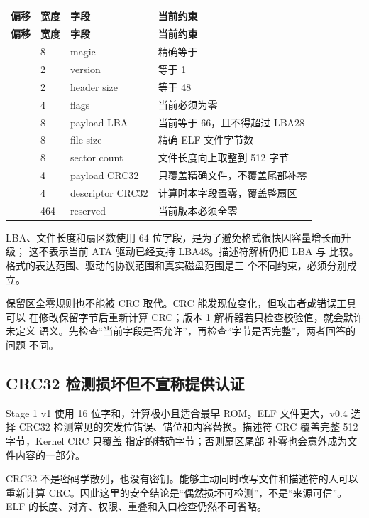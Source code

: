 \begin{longtable}{L{0.13\textwidth}L{0.12\textwidth}L{0.24\textwidth}L{0.39\textwidth}}
\toprule
\textbf{偏移} & \textbf{宽度} & \textbf{字段} & \textbf{当前约束}\\
\midrule
\endfirsthead
\toprule
\textbf{偏移} & \textbf{宽度} & \textbf{字段} & \textbf{当前约束}\\
\midrule
\endhead
{} & 8 & magic & 精确等于 \\
 & 2 & version & 等于 1\\
 & 2 & header size & 等于 48\\
 & 4 & flags & 当前必须为零\\
 & 8 & payload LBA & 当前等于 66，且不得超过 LBA28\\
 & 8 & file size & 精确 ELF 文件字节数\\
 & 8 & sector count & 文件长度向上取整到 512 字节\\
 & 4 & payload CRC32 & 只覆盖精确文件，不覆盖尾部补零\\
 & 4 & descriptor CRC32 & 计算时本字段置零，覆盖整扇区\\
 & 464 & reserved & 当前版本必须全零\\
\bottomrule
\end{longtable}

LBA、文件长度和扇区数使用 64 位字段，是为了避免格式很快因容量增长而升级；
这不表示当前 ATA 驱动已经支持 LBA48。描述符解析仍把 LBA 与
 比较。格式的表达范围、驱动的协议范围和真实磁盘范围是三
个不同约束，必须分别成立。

保留区全零规则也不能被 CRC 取代。CRC 能发现位变化，但攻击者或错误工具可以
在修改保留字节后重新计算 CRC；版本 1 解析器若只检查校验值，就会默许未定义
语义。先检查“当前字段是否允许”，再检查“字节是否完整”，两者回答的问题
不同。

\subsection{CRC32 检测损坏但不宣称提供认证}

Stage 1 v1 使用 16 位字和，计算极小且适合最早 ROM。ELF 文件更大，v0.4
选择 CRC32 检测常见的突发位错误、错位和内容替换。描述符 CRC 覆盖完整
512 字节，Kernel CRC 只覆盖  指定的精确字节；否则扇区尾部
补零也会意外成为文件内容的一部分。

CRC32 不是密码学散列，也没有密钥。能够主动同时改写文件和描述符的人可以
重新计算 CRC。因此这里的安全结论是“偶然损坏可检测”，不是“来源可信”。
ELF 的长度、对齐、权限、重叠和入口检查仍然不可省略。

